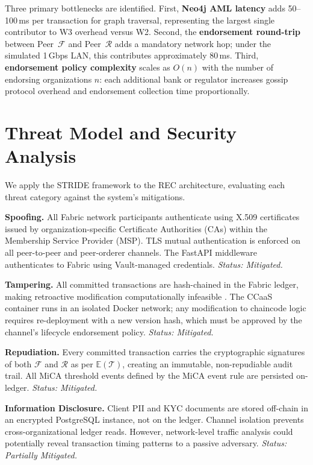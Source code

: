 \documentclass[journal,10pt,twocolumn]{IEEEtran}
\begin{document}
Three primary bottlenecks are identified. First, \textbf{Neo4j AML latency} adds 50--100\,ms per transaction for graph traversal, representing the largest single contributor to W3 overhead versus W2. Second, the \textbf{endorsement round-trip} between Peer~$\mathcal{F}$ and Peer~$\mathcal{R}$ adds a mandatory network hop; under the simulated 1\,Gbps LAN, this contributes approximately 80\,ms. Third, \textbf{endorsement policy complexity} scales as $O(n)$ with the number of endorsing organizations $n$: each additional bank or regulator increases gossip protocol overhead and endorsement collection time proportionally.

\section{Threat Model and Security Analysis}
\label{sec:threat}

We apply the STRIDE framework \cite{ref:stride} to the REC architecture, evaluating each threat category against the system's mitigations.

\textbf{Spoofing.} All Fabric network participants authenticate using X.509 certificates issued by organization-specific Certificate Authorities (CAs) within the Membership Service Provider (MSP). TLS mutual authentication is enforced on all peer-to-peer and peer-orderer channels. The FastAPI middleware authenticates to Fabric using Vault-managed credentials. \textit{Status: Mitigated.}

\textbf{Tampering.} All committed transactions are hash-chained in the Fabric ledger, making retroactive modification computationally infeasible \cite{ref:fabric}. The CCaaS container runs in an isolated Docker network; any modification to chaincode logic requires re-deployment with a new version hash, which must be approved by the channel's lifecycle endorsement policy. \textit{Status: Mitigated.}

\textbf{Repudiation.} Every committed transaction carries the cryptographic signatures of both $\mathcal{F}$ and $\mathcal{R}$ as per $\mathbb{E}(\mathcal{T})$, creating an immutable, non-repudiable audit trail. All MiCA threshold events defined by the MiCA event rule are persisted on-ledger. \textit{Status: Mitigated.}

\textbf{Information Disclosure.} Client PII and KYC documents are stored off-chain in an encrypted PostgreSQL instance, not on the ledger. Channel isolation prevents cross-organizational ledger reads. However, network-level traffic analysis could potentially reveal transaction timing patterns to a passive adversary. \textit{Status: Partially Mitigated.}
\end{document}
